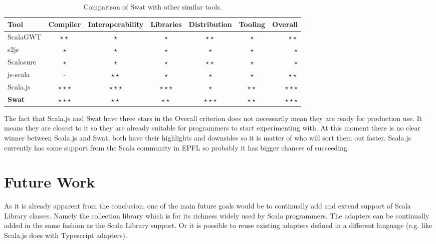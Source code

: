 \documentclass[12pt,a4paper]{report}
\begin{document}
\begin{table}[h]\footnotesize
	\def\arraystretch{1.5}
	\centering
	\begin{tabular}{l || c | c | c | c | c  || r}
		Tool				& Compiler 						& Interoperability	& Libraries 				& Distribution			& Tooling 					& Overall 					\\
		\hline						
	  ScalaGWT		& $\star\star$				&	$\star$						& $\star$						& $\star\star$			&	$\star$						& $\star\star$			\\
		s2js				& $\star$							& $\star$ 					& $\star$ 					&	$\star$						& $\star$						& $\star$			 			\\
		Scalosure		& $\star$							& $\star$ 					& $\star$ 					& $\star\star$			& $\star$						& $\star$			  		\\
		js-scala		& - 									& $\star\star$ 			& $\star$						& $\star$ 					& $\star$ 					& $\star\star$ 			\\
		Scala.js		& $\star\star\star$ 	& $\star\star\star$	& $\star\star\star$ &	$\star$						& $\star\star$			& $\star\star\star$ \\
		{\bf Swat}	& $\star\star\star$ 	& $\star\star$			& $\star\star$			& $\star\star\star$	& $\star\star$			& $\star\star\star$ \\
	\end{tabular}
	\caption{Comparison of Swat with other similar tools.}
	\label{tbl:Comparison}
\end{table}

The fact that Scala.js and Swat have three stars in the Overall criterion does not necessarily mean they are ready for production use. It means they are closest to it so they are already suitable for programmers to start experimenting with. At this moment there is no clear winner between Scala.js and Swat, both have their highlights and downsides so it is matter of who will sort them out faster. Scala.js currently has some support from the Scala community in EPFL so probably it has bigger chances of succeeding.

\section{Future Work}

As it is already apparent from the conclusion, one of the main future goals would be to continually add and extend support of Scala Library classes. Namely the collection library which is for its richness widely used by Scala programmers. The adapters can be continually added in the same fashion as the Scala Library support. Or it is possible to reuse existing adapters defined in a different language (e.g. like Scala.js does with Typescript adapters).
\end{document}
